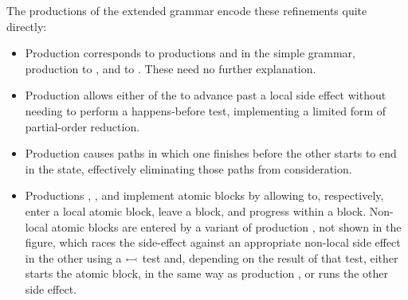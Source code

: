 The productions of the extended grammar encode these refinements quite
directly:
\begin{itemize}
\item Production  corresponds to productions
   and  in the simple grammar,
  production  to , and  to
  .  These need no further explanation.
\item Production  allows either of the {\StateMachines}
  to advance past a local side effect without needing to perform a
  happens-before test, implementing a limited form of partial-order
  reduction.
\item Production  causes paths in which one
  {\StateMachine} finishes before the other starts to end in the
  {\stUnreached} state, effectively eliminating those paths from
  consideration.
\item Productions , , and
   implement atomic blocks by allowing {\StateMachines}
  to, respectively, enter a local atomic block, leave a block, and
  progress within a block.  Non-local atomic blocks are entered by a
  variant of production , not shown in the figure,
  which races the {\stStartAtomic} side-effect against an appropriate
  non-local side effect in the other {\StateMachine} using a
  $\leftarrowtail$ test and, depending on the result of that test,
  either starts the atomic block, in the same way as production
  , or runs the other side effect.
\end{itemize}
